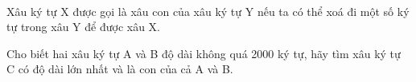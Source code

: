  

Xâu ký tự X được gọi là xâu con của xâu ký tự Y nếu ta có thể xoá đi một số ký tự trong xâu Y để được xâu X.

Cho biết hai xâu ký tự A và B độ dài không quá 2000 ký tự, hãy tìm xâu ký tự C có độ dài lớn nhất và là con của cả A và B.

\